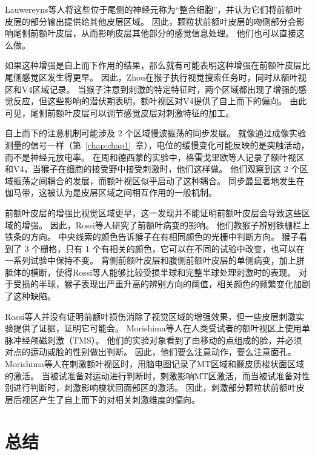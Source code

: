 Lauwereyns等人将这些位于尾侧的神经元称为“整合细胞”，并认为它们将前额叶皮层的部分输出提供给其他皮层区域。
因此，颗粒状前额叶皮层的吻侧部分会影响尾侧前额叶皮层，从而影响皮层其他部分的感觉信息处理。
他们也可以直接这么做。


如果这种增强是自上而下作用的结果，那么就有可能表明这种增强在前额叶皮层比尾侧感觉区发生得更早。
因此，Zhou\cite{zhou2011feature}在猴子执行视觉搜索任务时，同时从额叶视区和V4区域记录。
当猴子注意到刺激的特定特征时，两个区域都出现了增强的感觉反应，但这些影响的潜伏期表明，额叶视区对V4提供了自上而下的偏向。
由此可见，尾侧前额叶皮层可以调节感觉皮层对刺激特征的加工。


自上而下的注意机制可能涉及 2 个区域慢波振荡的同步发展。
就像通过成像实验测量的信号一样（第~\ref{chap:chap1}~章），电位的缓慢变化可能反映的是突触活动，而不是神经元放电率。
在周和德西蒙的实验中，格雷戈里欧等人\cite{gregoriou2009high}记录了额叶视区和V4，当猴子在细胞的接受野中接受刺激时，他们这样做。
他们观察到这 2 个区域振荡之间耦合的发展，而额叶视区似乎启动了这种耦合。
同步最显著地发生在伽马带，这被认为是皮层区域之间相互作用的一般机制\cite{womelsdorf2007modulation}。


前额叶皮层的增强比视觉区域更早，这一发现并不能证明前额叶皮层会导致这些区域的增强。
因此，Rossi等人\cite{rossi2009prefrontal}研究了前额叶病变的影响。
他们教猴子辨别铁栅栏上铁条的方向。
中央线索的颜色告诉猴子在有相同颜色的光栅中判断方向。
猴子看到了 3 个栅格，只有 1 个有相关的颜色，它可以在不同的试验中改变，也可以在一系列试验中保持不变。
背侧前额叶皮层和腹侧前额叶皮层的单侧病变，加上胼胝体的横断，使得Rossi等人能够比较受损半球和完整半球处理刺激时的表现。
对于受损的半球，猴子表现出严重升高的辨别方向的阈值，相关颜色的频繁变化加剧了这种缺陷。


Rossi等人并没有证明前额叶损伤消除了视觉区域的增强效果，但一些皮层刺激实验提供了证据，证明它可能会。
Morishima等人\cite{morishima2009task}在人类受试者的额叶视区上使用单脉冲经颅磁刺激（TMS）。
他们的实验对象看到了由移动的点组成的脸，并必须对点的运动或脸的性别做出判断。
因此，他们要么注意动作，要么注意面孔。
Morishima等人在刺激额叶视区时，用脑电图记录了MT区域和颞皮质梭状面区域的激活。
当被试准备对运动进行判断时，刺激影响MT区激活，而当被试准备对性别进行判断时，刺激影响梭状回面部区的激活。
因此，刺激部分颗粒状前额叶皮层后视区产生了自上而下的对相关刺激维度的偏向。



\section{总结}

